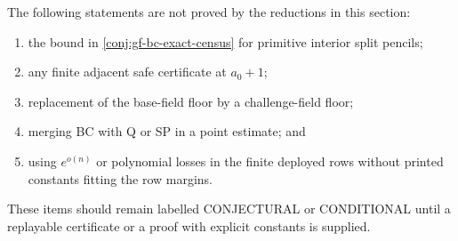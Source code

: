 \begin{remark}
\label{rem:gf-bc-overclaiming}
The following statements are not proved by the reductions in this section:
\begin{enumerate}[label=\textup{(\roman*)}]
\item the bound in \cref{conj:gf-bc-exact-census} for primitive interior
split pencils;
\item any finite adjacent safe certificate at \(a_0+1\);
\item replacement of the base-field floor by a challenge-field floor;
\item merging BC with Q or SP in a point estimate; and
\item using \(e^{o(n)}\) or polynomial losses in the finite deployed rows
without printed constants fitting the row margins.
\end{enumerate}
These items should remain labelled CONJECTURAL or CONDITIONAL until a replayable
certificate or a proof with explicit constants is supplied.
\end{remark}
